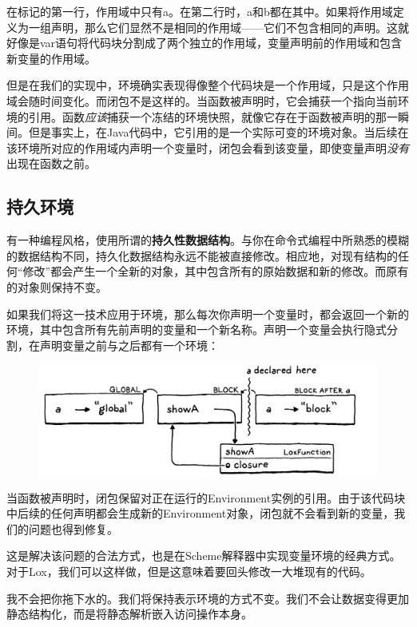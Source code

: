 \documentclass[cn,11pt,chinese]{elegantbook}
\begin{document}
{在标记的第一行，作用域中只有a。在第二行时，a和b都在其中。如果将作用域定义为一组声明，那么它们显然不是相同的作用域——它们不包含相同的声明。这就好像是var语句将代码块分割成了两个独立的作用域，变量声明前的作用域和包含新变量的作用域。

但是在我们的实现中，环境确实表现得像整个代码块是一个作用域，只是这个作用域会随时间变化。而闭包不是这样的。当函数被声明时，它会捕获一个指向当前环境的引用。函数\textit{应该}捕获一个冻结的环境快照，就像它存在于函数被声明的那一瞬间。但是事实上，在Java代码中，它引用的是一个实际可变的环境对象。当后续在该环境所对应的作用域内声明一个变量时，闭包会看到该变量，即使变量声明\textit{没有}出现在函数之前。

\subsection{持久环境}

有一种编程风格，使用所谓的\textbf{持久性数据结构}。与你在命令式编程中所熟悉的模糊的数据结构不同，持久化数据结构永远不能被直接修改。相应地，对现有结构的任何“修改”都会产生一个全新的对象，其中包含所有的原始数据和新的修改。而原有的对象则保持不变。

如果我们将这一技术应用于环境，那么每次你声明一个变量时，都会返回一个新的环境，其中包含所有先前声明的变量和一个新名称。声明一个变量会执行隐式分割，在声明变量之前与之后都有一个环境：

\begin{figure}[htbp]
  \centering
  \includegraphics[width=\textwidth]{image/resolving-and-binding/split.png}
\end{figure}

当函数被声明时，闭包保留对正在运行的Environment实例的引用。由于该代码块中后续的任何声明都会生成新的Environment对象，闭包就不会看到新的变量，我们的问题也得到修复。

这是解决该问题的合法方式，也是在Scheme解释器中实现变量环境的经典方式。对于Lox，我们可以这样做，但是这意味着要回头修改一大堆现有的代码。

我不会把你拖下水的。我们将保持表示环境的方式不变。我们不会让数据变得更加静态结构化，而是将静态解析嵌入访问操作本身。

}
\end{document}
